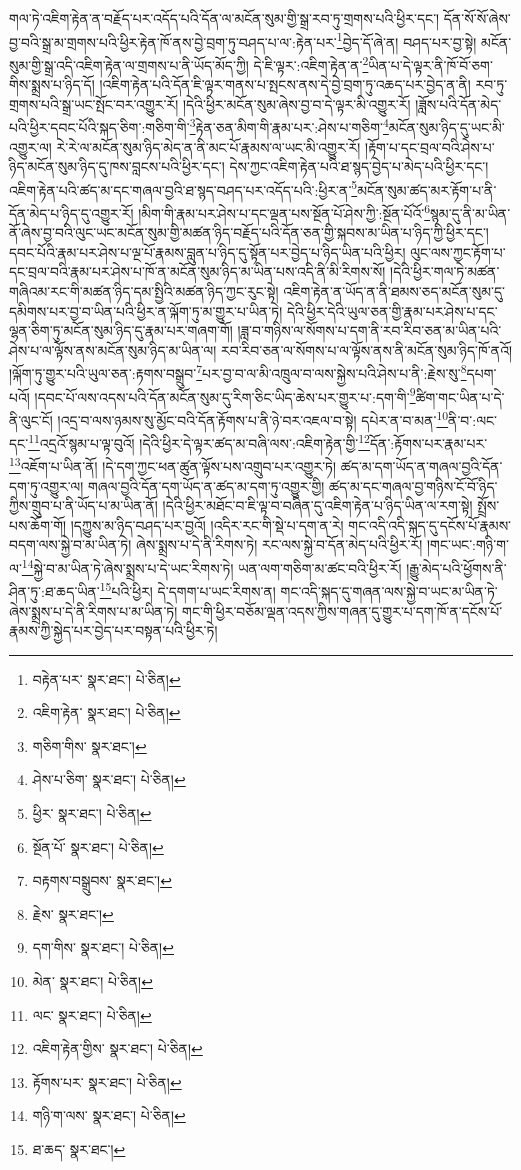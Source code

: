 གལ་ཏེ་འཇིག་རྟེན་ན་བརྗོད་པར་འདོད་པའི་དོན་ལ་མངོན་སུམ་གྱི་སྒྲ་རབ་ཏུ་གྲགས་པའི་ཕྱིར་དང་། དོན་སོ་སོ་ཞེས་བྱ་བའི་སྒྲ་མ་གྲགས་པའི་ཕྱིར་རྟེན་ཁོ་ནས་བྱེ་བྲག་ཏུ་བཤད་པ་ལ་:རྟེན་པར་\footnote{བརྟེན་པར་  སྣར་ཐང་།  པེ་ཅིན། }བྱེད་དོ་ཞེ་ན། བཤད་པར་བྱ་སྟེ། མངོན་སུམ་གྱི་སྒྲ་འདི་འཇིག་རྟེན་ལ་གྲགས་པ་ནི་ཡོད་མོད་ཀྱི། དེ་ཇི་ལྟར་:འཇིག་རྟེན་ན་\footnote{འཇིག་རྟེན་  སྣར་ཐང་།  པེ་ཅིན། }ཡིན་པ་དེ་ལྟར་ནི་ཁོ་བོ་ཅག་གིས་སྨྲས་པ་ཉིད་དོ། །འཇིག་རྟེན་པའི་དོན་ཇི་ལྟར་གནས་པ་སྤངས་ནས་དེ་བྱེ་བྲག་ཏུ་འཆད་པར་བྱེད་ན་ནི། རབ་ཏུ་གྲགས་པའི་སྒྲ་ཡང་སྤོང་བར་འགྱུར་རོ། །དེའི་ཕྱིར་མངོན་སུམ་ཞེས་བྱ་བ་དེ་ལྟར་མི་འགྱུར་རོ། །ཟློས་པའི་དོན་མེད་པའི་ཕྱིར་དབང་པོའི་སྐད་ཅིག་:གཅིག་གི་\footnote{གཅིག་གིས་  སྣར་ཐང་། }རྟེན་ཅན་མིག་གི་རྣམ་པར་:ཤེས་པ་གཅིག་\footnote{ཤེས་པ་ཅིག་  སྣར་ཐང་།  པེ་ཅིན། }མངོན་སུམ་ཉིད་དུ་ཡང་མི་འགྱུར་ལ། རེ་རེ་ལ་མངོན་སུམ་ཉིད་མེད་ན་ནི་མང་པོ་རྣམས་ལ་ཡང་མི་འགྱུར་རོ། །རྟོག་པ་དང་བྲལ་བའི་ཤེས་པ་ཉིད་མངོན་སུམ་ཉིད་དུ་ཁས་བླངས་པའི་ཕྱིར་དང་། དེས་ཀྱང་འཇིག་རྟེན་པའི་ཐ་སྙད་བྱེད་པ་མེད་པའི་ཕྱིར་དང་། འཇིག་རྟེན་པའི་ཚད་མ་དང་གཞལ་བྱའི་ཐ་སྙད་བཤད་པར་འདོད་པའི་:ཕྱིར་ན་\footnote{ཕྱིར་  སྣར་ཐང་།  པེ་ཅིན། }མངོན་སུམ་ཚད་མར་རྟོག་པ་ནི་དོན་མེད་པ་ཉིད་དུ་འགྱུར་རོ། །མིག་གི་རྣམ་པར་ཤེས་པ་དང་ལྡན་པས་སྔོན་པོ་ཤེས་ཀྱི་:སྔོན་པོའོ་\footnote{སྔོན་པོ་  སྣར་ཐང་།  པེ་ཅིན། }སྙམ་དུ་ནི་མ་ཡིན་ནོ་ཞེས་བྱ་བའི་ལུང་ཡང་མངོན་སུམ་གྱི་མཚན་ཉིད་བརྗོད་པའི་དོན་ཅན་གྱི་སྐབས་མ་ཡིན་པ་ཉིད་ཀྱི་ཕྱིར་དང་། དབང་པོའི་རྣམ་པར་ཤེས་པ་ལྔ་པོ་རྣམས་བླུན་པ་ཉིད་དུ་སྟོན་པར་བྱེད་པ་ཉིད་ཡིན་པའི་ཕྱིར། ལུང་ལས་ཀྱང་རྟོག་པ་དང་བྲལ་བའི་རྣམ་པར་ཤེས་པ་ཁོ་ན་མངོན་སུམ་ཉིད་མ་ཡིན་པས་འདི་ནི་མི་རིགས་སོ། །དེའི་ཕྱིར་གལ་ཏེ་མཚན་གཞིའམ་རང་གི་མཚན་ཉིད་དམ་སྤྱིའི་མཚན་ཉིད་ཀྱང་རུང་སྟེ། འཇིག་རྟེན་ན་ཡོད་ན་ནི་ཐམས་ཅད་མངོན་སུམ་དུ་དམིགས་པར་བྱ་བ་ཡིན་པའི་ཕྱིར་ན་ལྐོག་ཏུ་མ་གྱུར་པ་ཡིན་ཏེ། དེའི་ཕྱིར་དེའི་ཡུལ་ཅན་གྱི་རྣམ་པར་ཤེས་པ་དང་ལྷན་ཅིག་ཏུ་མངོན་སུམ་ཉིད་དུ་རྣམ་པར་གཞག་གོ། །ཟླ་བ་གཉིས་ལ་སོགས་པ་དག་ནི་རབ་རིབ་ཅན་མ་ཡིན་པའི་ཤེས་པ་ལ་ལྟོས་ནས་མངོན་སུམ་ཉིད་མ་ཡིན་ལ། རབ་རིབ་ཅན་ལ་སོགས་པ་ལ་ལྟོས་ནས་ནི་མངོན་སུམ་ཉིད་ཁོ་ནའོ། །ལྐོག་ཏུ་གྱུར་པའི་ཡུལ་ཅན་:རྟགས་བསྒྲུབ་\footnote{བརྟགས་བསྒྲུབས་  སྣར་ཐང་། }པར་བྱ་བ་ལ་མི་འཁྲུལ་བ་ལས་སྐྱེས་པའི་ཤེས་པ་ནི་:རྗེས་སུ་\footnote{རྗེས་  སྣར་ཐང་། }དཔག་པའོ། །དབང་པོ་ལས་འདས་པའི་དོན་མངོན་སུམ་དུ་རིག་ཅིང་ཡིད་ཆེས་པར་གྱུར་པ་:དག་གི་\footnote{དག་གིས་  སྣར་ཐང་།  པེ་ཅིན། }ཚིག་གང་ཡིན་པ་དེ་ནི་ལུང་ངོ། །འདྲ་བ་ལས་ཉམས་སུ་མྱོང་བའི་དོན་རྟོགས་པ་ནི་ཉེ་བར་འཇལ་བ་སྟེ། དཔེར་ན་བ་མན་\footnote{མེན་  སྣར་ཐང་།  པེ་ཅིན། }ནི་བ་:ལང་དང་\footnote{ལང་  སྣར་ཐང་།  པེ་ཅིན། }འདྲའོ་སྙམ་པ་ལྟ་བུའོ། །དེའི་ཕྱིར་དེ་ལྟར་ཚད་མ་བཞི་ལས་:འཇིག་རྟེན་གྱི་\footnote{འཇིག་རྟེན་གྱིས་  སྣར་ཐང་།  པེ་ཅིན། }དོན་:རྟོགས་པར་རྣམ་པར་\footnote{རྟོགས་པར་  སྣར་ཐང་།  པེ་ཅིན། }འཇོག་པ་ཡིན་ནོ། །དེ་དག་ཀྱང་ཕན་ཚུན་ལྟོས་པས་འགྲུབ་པར་འགྱུར་ཏེ། ཚད་མ་དག་ཡོད་ན་གཞལ་བྱའི་དོན་དག་ཏུ་འགྱུར་ལ། གཞལ་བྱའི་དོན་དག་ཡོད་ན་ཚད་མ་དག་ཏུ་འགྱུར་གྱི། ཚད་མ་དང་གཞལ་བྱ་གཉིས་ངོ་བོ་ཉིད་ཀྱིས་གྲུབ་པ་ནི་ཡོད་པ་མ་ཡིན་ནོ། །དེའི་ཕྱིར་མཐོང་བ་ཇི་ལྟ་བ་བཞིན་དུ་འཇིག་རྟེན་པ་ཉིད་ཡིན་ལ་རག་སྟེ། སྤྲོས་པས་ཆོག་གོ། །དཀྱུས་མ་ཉིད་བཤད་པར་བྱའོ། །འདིར་རང་གི་སྡེ་པ་དག་ན་རེ། གང་འདི་འདི་སྐད་དུ་དངོས་པོ་རྣམས་བདག་ལས་སྐྱེ་བ་མ་ཡིན་ཏེ། ཞེས་སྨྲས་པ་དེ་ནི་རིགས་ཏེ། རང་ལས་སྐྱེ་བ་དོན་མེད་པའི་ཕྱིར་རོ། །གང་ཡང་:གཉི་ག་ལ་\footnote{གཉི་ག་ལས་  སྣར་ཐང་།  པེ་ཅིན། }སྐྱེ་བ་མ་ཡིན་ཏེ་ཞེས་སྨྲས་པ་དེ་ཡང་རིགས་ཏེ། ཡན་ལག་གཅིག་མ་ཚང་བའི་ཕྱིར་རོ། །རྒྱུ་མེད་པའི་ཕྱོགས་ནི་ཤིན་ཏུ་:ཐ་ཆད་ཡིན་\footnote{ཐ་ཆད་  སྣར་ཐང་། }པའི་ཕྱིར། དེ་དགག་པ་ཡང་རིགས་ན། གང་འདི་སྐད་དུ་གཞན་ལས་སྐྱེ་བ་ཡང་མ་ཡིན་ཏེ་ཞེས་སྨྲས་པ་དེ་ནི་རིགས་པ་མ་ཡིན་ཏེ། གང་གི་ཕྱིར་བཅོམ་ལྡན་འདས་ཀྱིས་གཞན་དུ་གྱུར་པ་དག་ཁོ་ན་དངོས་པོ་རྣམས་ཀྱི་སྐྱེད་པར་བྱེད་པར་བསྟན་པའི་ཕྱིར་ཏེ། 